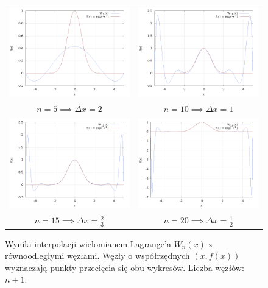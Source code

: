 \begin{figure}[h!]
	\begin{tabular}{cc}
		\includegraphics[width=75mm]{n5.png} &   \includegraphics[width=75mm]{n10.png} \\
	$ n = 5 \implies \Delta x = 2 $ & $ n = 10 \implies \Delta x = 1 $ \\[6pt]
		\includegraphics[width=75mm]{n15.png} &   \includegraphics[width=75mm]{n20.png} \\
		$ n = 15 \implies \Delta x = \frac{2}{3} $ & $ n = 20 \implies \Delta x = \frac{1}{2} $ \\[6pt]
	\end{tabular}
	\caption{Wyniki interpolacji wielomianem Lagrange’a $ W_n(x) $ z równoodległymi węzłami. Węzły \newline o współrzędnych $ (x, f(x)) $ wyznaczają punkty przecięcia się obu wykresów. Liczba węzłów: $ n + 1 $.}
	\label{rowno}
\end{figure}
